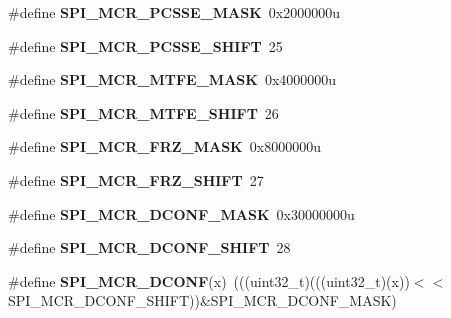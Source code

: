 \begin{DoxyCompactItemize}
\item 
\#define {\bfseries S\+P\+I\+\_\+\+M\+C\+R\+\_\+\+P\+C\+S\+S\+E\+\_\+\+M\+A\+SK}~0x2000000u\hypertarget{group__SPI__Register__Masks_ga479a7a3131d4356e53f7f86bd4cd0245}{}\label{group__SPI__Register__Masks_ga479a7a3131d4356e53f7f86bd4cd0245}

\item 
\#define {\bfseries S\+P\+I\+\_\+\+M\+C\+R\+\_\+\+P\+C\+S\+S\+E\+\_\+\+S\+H\+I\+FT}~25\hypertarget{group__SPI__Register__Masks_ga4dc49f49441cc797619c160757bd7d2d}{}\label{group__SPI__Register__Masks_ga4dc49f49441cc797619c160757bd7d2d}

\item 
\#define {\bfseries S\+P\+I\+\_\+\+M\+C\+R\+\_\+\+M\+T\+F\+E\+\_\+\+M\+A\+SK}~0x4000000u\hypertarget{group__SPI__Register__Masks_ga3fa9d02b4302f9963c26383bdeb35da8}{}\label{group__SPI__Register__Masks_ga3fa9d02b4302f9963c26383bdeb35da8}

\item 
\#define {\bfseries S\+P\+I\+\_\+\+M\+C\+R\+\_\+\+M\+T\+F\+E\+\_\+\+S\+H\+I\+FT}~26\hypertarget{group__SPI__Register__Masks_gaaff9ea9fcaf46dc8bfd358d941e0d3ac}{}\label{group__SPI__Register__Masks_gaaff9ea9fcaf46dc8bfd358d941e0d3ac}

\item 
\#define {\bfseries S\+P\+I\+\_\+\+M\+C\+R\+\_\+\+F\+R\+Z\+\_\+\+M\+A\+SK}~0x8000000u\hypertarget{group__SPI__Register__Masks_ga6d4131c2e45352910d630723c1172d2c}{}\label{group__SPI__Register__Masks_ga6d4131c2e45352910d630723c1172d2c}

\item 
\#define {\bfseries S\+P\+I\+\_\+\+M\+C\+R\+\_\+\+F\+R\+Z\+\_\+\+S\+H\+I\+FT}~27\hypertarget{group__SPI__Register__Masks_ga7500a54a21171d20a3bbf0355350c9bd}{}\label{group__SPI__Register__Masks_ga7500a54a21171d20a3bbf0355350c9bd}

\item 
\#define {\bfseries S\+P\+I\+\_\+\+M\+C\+R\+\_\+\+D\+C\+O\+N\+F\+\_\+\+M\+A\+SK}~0x30000000u\hypertarget{group__SPI__Register__Masks_gab6f80a07ce3be21ee0de56c3de90f380}{}\label{group__SPI__Register__Masks_gab6f80a07ce3be21ee0de56c3de90f380}

\item 
\#define {\bfseries S\+P\+I\+\_\+\+M\+C\+R\+\_\+\+D\+C\+O\+N\+F\+\_\+\+S\+H\+I\+FT}~28\hypertarget{group__SPI__Register__Masks_ga5f84d391d6b5838c50b44217617d66a8}{}\label{group__SPI__Register__Masks_ga5f84d391d6b5838c50b44217617d66a8}

\item 
\#define {\bfseries S\+P\+I\+\_\+\+M\+C\+R\+\_\+\+D\+C\+O\+NF}(x)~(((uint32\+\_\+t)(((uint32\+\_\+t)(x))$<$$<$S\+P\+I\+\_\+\+M\+C\+R\+\_\+\+D\+C\+O\+N\+F\+\_\+\+S\+H\+I\+FT))\&S\+P\+I\+\_\+\+M\+C\+R\+\_\+\+D\+C\+O\+N\+F\+\_\+\+M\+A\+SK)\hypertarget{group__SPI__Register__Masks_ga4157226a8f489e3d1d8321beed0afcb6}{}\label{group__SPI__Register__Masks_ga4157226a8f489e3d1d8321beed0afcb6}


\end{DoxyCompactItemize}
